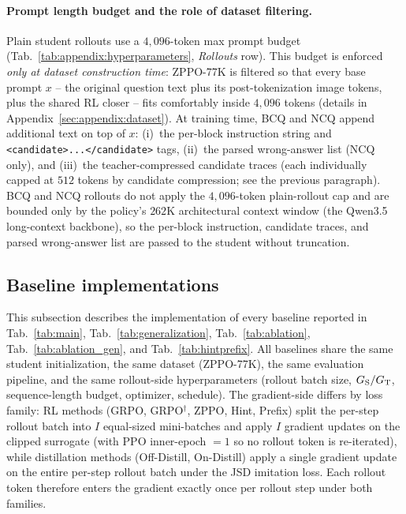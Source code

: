 \paragraph{Prompt length budget and the role of dataset filtering.}
Plain student rollouts use a $4{,}096$-token max prompt budget (Tab.~\ref{tab:appendix:hyperparameters}, \emph{Rollouts} row). This budget is enforced \emph{only at dataset construction time}: ZPPO-77K is filtered so that every base prompt $x$ -- the original question text plus its post-tokenization image tokens, plus the shared RL closer -- fits comfortably inside $4{,}096$ tokens (details in Appendix~\ref{sec:appendix:dataset}). At training time, BCQ and NCQ append additional text on top of $x$: (i)~the per-block instruction string and \texttt{<candidate>...</candidate>} tags, (ii)~the parsed wrong-answer list (NCQ only), and (iii)~the teacher-compressed candidate traces (each individually capped at $512$ tokens by candidate compression; see the previous paragraph). BCQ and NCQ rollouts do not apply the $4{,}096$-token plain-rollout cap and are bounded only by the policy's $262$K architectural context window (the Qwen3.5 long-context backbone), so the per-block instruction, candidate traces, and parsed wrong-answer list are passed to the student without truncation.

\subsection{Baseline implementations}
\label{sec:appendix:baselines}

This subsection describes the implementation of every baseline reported in Tab.~\ref{tab:main}, Tab.~\ref{tab:generalization}, Tab.~\ref{tab:ablation}, Tab.~\ref{tab:ablation_gen}, and Tab.~\ref{tab:hintprefix}. All baselines share the same student initialization, the same dataset (ZPPO-77K), the same evaluation pipeline, and the same rollout-side hyperparameters (rollout batch size, $G_{\rm S}/G_{\rm T}$, sequence-length budget, optimizer, schedule). The gradient-side differs by loss family: RL methods (GRPO, GRPO$^{\dagger}$, ZPPO, Hint, Prefix) split the per-step rollout batch into $I$ equal-sized mini-batches and apply $I$ gradient updates on the clipped surrogate (with PPO inner-epoch $=1$ so no rollout token is re-iterated), while distillation methods (Off-Distill, On-Distill) apply a single gradient update on the entire per-step rollout batch under the JSD imitation loss. Each rollout token therefore enters the gradient exactly once per rollout step under both families.

